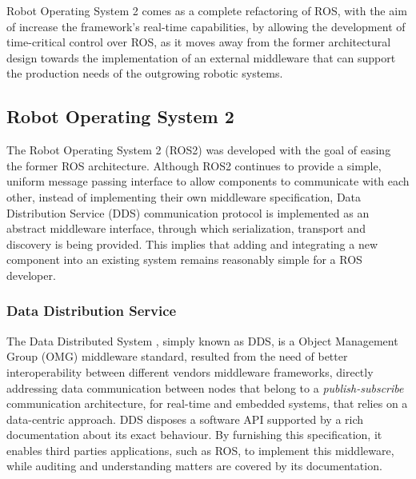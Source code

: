Robot Operating System 2 comes as a complete refactoring of ROS, with the aim of increase the framework's real-time capabilities, by allowing the development of time-critical control over ROS, as it moves away from the former architectural design towards the implementation of an external middleware that can support the production needs of the outgrowing robotic systems. \cite{kim2018security, casini2019response}


\subsection{Robot Operating System 2}

The Robot Operating System 2 (ROS2) was developed with the goal of easing the former ROS architecture. Although ROS2 continues to provide a simple, uniform message passing interface to allow components to communicate with each other, instead of implementing their own middleware specification, Data Distribution Service (DDS) communication protocol is implemented as an abstract middleware interface, through which serialization, transport and discovery is being provided. This implies that adding and integrating a new component into an existing system remains reasonably simple for a ROS developer.

\subsubsection{Data Distribution Service}

The Data Distributed System \cite{3}, simply known as DDS, is a Object Management Group (OMG) middleware standard, resulted from the need of better interoperability between different vendors middleware frameworks, directly addressing data communication between nodes that belong to a \textit{publish-subscribe} communication architecture, for real-time and embedded systems, that relies on a data-centric approach. DDS disposes a software API supported by a rich documentation about its exact behaviour. By furnishing this specification, it enables third parties applications, such as ROS, to implement this middleware, while auditing and understanding matters are covered by its documentation.
            
